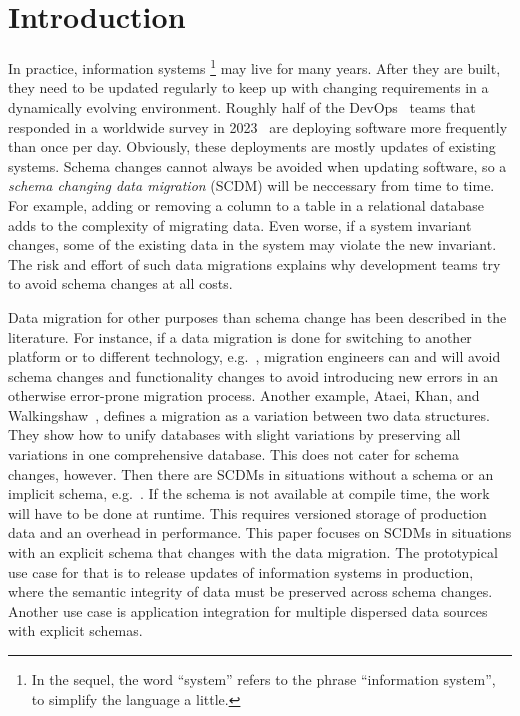 \documentclass[runningheads]{llncs}
\begin{document}
\section{Introduction}
\label{sct:Introduction}
   In practice, information systems%
   \footnote{In the sequel, the word ``system'' refers to the phrase ``information system'', to simplify the language a little.}
   may live for many years.
   After they are built, they need to be updated regularly to keep up with changing requirements in a dynamically evolving environment.
   Roughly half of the DevOps~\cite{BassWeberZhu15} teams that responded in a worldwide survey in 2023~\cite{HumanitecDevOps2023} are deploying software more frequently than once per day.
   Obviously, these deployments are mostly updates of existing systems.
   Schema changes cannot always be avoided when updating software, so a {\em schema changing data migration} (SCDM) will be neccessary from time to time.
   For example, adding or removing a column to a table in a relational database adds to the complexity of migrating data.
   Even worse, if a system invariant changes, some of the existing data in the system may violate the new invariant.
   The risk and effort of such data migrations explains why development teams try to avoid schema changes at all costs.

   Data migration for other purposes than schema change has been described in the literature.
   For instance, if a data migration is done for switching to another platform or to different technology,
   e.g.~\cite{Gholami2016,Bisbal1999},
   migration engineers can and will avoid schema changes and functionality changes to avoid introducing new errors in an otherwise error-prone migration process.
   Another example, Ataei, Khan, and Walkingshaw~\cite{Ataei2021,Walkingshaw2014}, defines a migration as a variation between two data structures.
   They show how to unify databases with slight variations by preserving all variations in one comprehensive database.
   This does not cater for schema changes, however.
   Then there are SCDMs in situations without a schema or an implicit schema, e.g.~\cite{Hillenbrand2022}.
   If the schema is not available at compile time, the work will have to be done at runtime.
   This requires versioned storage of production data and an overhead in performance.
   This paper focuses on SCDMs in situations with an explicit schema that changes with the data migration.
   The prototypical use case for that is to release updates of information systems in production,
   where the semantic integrity of data must be preserved across schema changes.
   Another use case is application integration for multiple dispersed data sources with explicit schemas.
\end{document}
